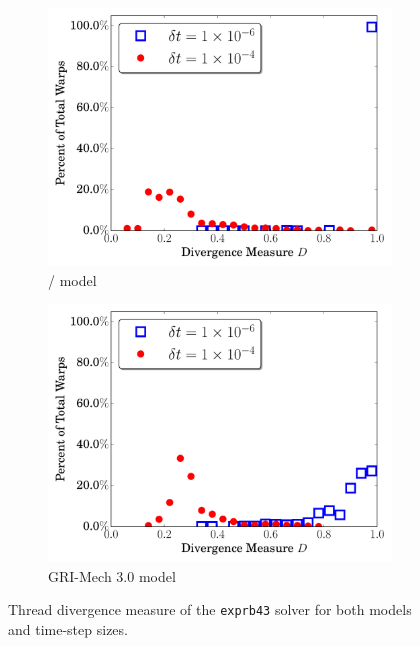 \documentclass[final,twocolumn]{elsarticle}
\begin{document}
\begin{figure}[htb]
  \ifmeasure
  \fontsize{8pt}{10pt}\selectfont
  \fi
  \centering
  \begin{subfigure}{0.49\textwidth}
      \includegraphics[width=\linewidth]{H2_exprb43_div.pdf}
      \caption{\slash{} model}
  \end{subfigure}
  \begin{subfigure}{0.49\textwidth}
      \includegraphics[width=\linewidth]{CH4_exprb43_div.pdf}
      \caption{GRI-Mech 3.0 model}
  \end{subfigure}
  \caption{Thread divergence measure of the \texttt{exprb43} solver for both models and time-step sizes.}
  \label{F:exp_divergence}
\end{figure}
\end{document}
